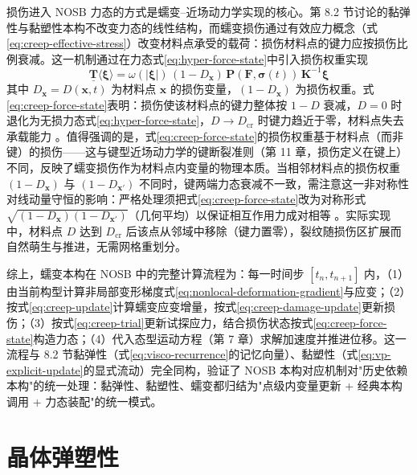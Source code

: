 损伤进入 NOSB 力态的方式是蠕变--近场动力学实现的核心。第 8.2 节讨论的黏弹性与黏塑性本构不改变力态的线性结构，而蠕变损伤通过有效应力概念（式\eqref{eq:creep-effective-stress}）改变材料点承受的载荷：损伤材料点的键力应按损伤比例衰减。这一机制通过在力态式\eqref{eq:hyper-force-state}中引入损伤权重实现
\begin{equation}
  \underline{\mathbf{T}}\langle\boldsymbol{\xi}\rangle
  =\omega(|\boldsymbol{\xi}|)\,(1-D_{\mathbf{x}})\,\mathbf{P}(\mathbf{F},\boldsymbol{\sigma}(t))\,\mathbf{K}^{-1}\boldsymbol{\xi}
  \label{eq:creep-force-state}
\end{equation}
其中 $D_{\mathbf{x}}=D(\mathbf{x},t)$ 为材料点 $\mathbf{x}$ 的损伤变量，$(1-D_{\mathbf{x}})$ 为损伤权重。式\eqref{eq:creep-force-state}表明：损伤使该材料点的键力整体按 $1-D$ 衰减，$D=0$ 时退化为无损力态式\eqref{eq:hyper-force-state}，$D\to D_{\mathrm{cr}}$ 时键力趋近于零，材料点失去承载能力 \cite{KulkarniTabarraei2020}。值得强调的是，式\eqref{eq:creep-force-state}的损伤权重基于材料点（而非键）的损伤——这与键型近场动力学的键断裂准则（第 11 章，损伤定义在键上）不同，反映了蠕变损伤作为材料点内变量的物理本质。当相邻材料点的损伤权重 $(1-D_{\mathbf{x}})$ 与 $(1-D_{\mathbf{x}'})$ 不同时，键两端力态衰减不一致，需注意这一非对称性对线动量守恒的影响：严格处理须把式\eqref{eq:creep-force-state}改为对称形式 $\sqrt{(1-D_{\mathbf{x}})(1-D_{\mathbf{x}'})}$（几何平均）以保证相互作用力成对相等 \cite{KulkarniTabarraei2020}。实际实现中，材料点 $D$ 达到 $D_{\mathrm{cr}}$ 后该点从邻域中移除（键力置零），裂纹随损伤区扩展而自然萌生与推进，无需网格重划分。

综上，蠕变本构在 NOSB 中的完整计算流程为：每一时间步 $[t_{n},t_{n+1}]$ 内，（1）由当前构型计算非局部变形梯度式\eqref{eq:nonlocal-deformation-gradient}与应变；（2）按式\eqref{eq:creep-update}计算蠕变应变增量，按式\eqref{eq:creep-damage-update}更新损伤；（3）按式\eqref{eq:creep-trial}更新试探应力，结合损伤状态按式\eqref{eq:creep-force-state}构造力态；（4）代入态型运动方程（第 7 章）求解加速度并推进位移。这一流程与 8.2 节黏弹性（式\eqref{eq:visco-recurrence}的记忆向量）、黏塑性（式\eqref{eq:vp-explicit-update}的显式流动）完全同构，验证了 NOSB 本构对应机制对"历史依赖本构"的统一处理：黏弹性、黏塑性、蠕变都归结为"点级内变量更新 + 经典本构调用 + 力态装配"的统一模式。

\section{晶体弹塑性}\label{sec:crystal-plasticity}

